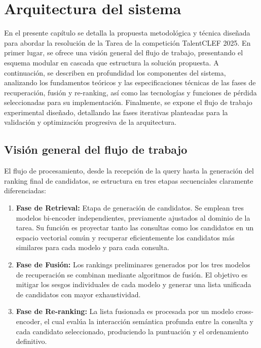 
\chapter{Arquitectura del sistema}
\label{ch:Arquitectura_del_sistema}

\noindent En el presente capítulo se detalla la propuesta metodológica y técnica diseñada para abordar la resolución de la \gls{Tarea} de la competición TalentCLEF 2025. En primer lugar, se ofrece una visión general del flujo de trabajo, presentando el esquema modular en cascada que estructura la solución propuesta. A continuación, se describen en profundidad los componentes del sistema, analizando los fundamentos teóricos y las especificaciones técnicas de las fases de recuperación, fusión y re-ranking, así como las tecnologías y funciones de pérdida seleccionadas para su implementación. Finalmente, se expone el flujo de trabajo experimental diseñado, detallando las fases iterativas planteadas para la validación y optimización progresiva de la arquitectura.

\section{Visión general del flujo de trabajo}
\label{sec:Arquitectura_General}

\noindent El flujo de procesamiento, desde la recepción de la query hasta la generación del ranking final de candidatos, se estructura en tres etapas secuenciales claramente diferenciadas:

\begin{enumerate}
    \item \textbf{Fase de Retrieval:} Etapa de generación de candidatos. Se emplean tres modelos bi-encoder independientes, previamente ajustados al dominio de la tarea. Su función es proyectar tanto las consultas como los candidatos en un espacio vectorial común y recuperar eficientemente los candidatos más similares para cada modelo y para cada consulta.
          
    \item \textbf{Fase de Fusión:} Los rankings preliminares generados por los tres modelos de recuperación se combinan mediante algoritmos de fusión. El objetivo es mitigar los sesgos individuales de cada modelo y generar una lista unificada de candidatos con mayor exhaustividad.
          
    \item \textbf{Fase de Re-ranking:} La lista fusionada es procesada por un modelo cross-encoder, el cual evalúa la interacción semántica profunda entre la consulta y cada candidato seleccionado, produciendo la puntuación y el ordenamiento definitivo.
\end{enumerate}

